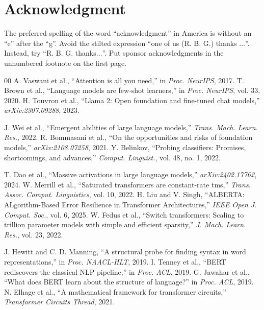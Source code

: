 \documentclass[conference]{IEEEtran}
\begin{document}
\section*{Acknowledgment}

The preferred spelling of the word ``acknowledgment'' in America is without 
an ``e'' after the ``g''. Avoid the stilted expression ``one of us (R. B. 
G.) thanks $\ldots$''. Instead, try ``R. B. G. thanks$\ldots$''. Put sponsor 
acknowledgments in the unnumbered footnote on the first page.


\begin{thebibliography}{00}
 A. Vaswani et al., ``Attention is all you need,'' in \emph{Proc. NeurIPS}, 2017.
 T. Brown et al., ``Language models are few-shot learners,'' in \emph{Proc. NeurIPS}, vol. 33, 2020.
 H. Touvron et al., ``Llama 2: Open foundation and fine-tuned chat models,'' \emph{arXiv:2307.09288}, 2023.

 J. Wei et al., ``Emergent abilities of large language models,'' \emph{Trans. Mach. Learn. Res.}, 2022.
 R. Bommasani et al., ``On the opportunities and risks of foundation models,'' \emph{arXiv:2108.07258}, 2021.
 Y. Belinkov, ``Probing classifiers: Promises, shortcomings, and advances,'' \emph{Comput. Linguist.}, vol. 48, no. 1, 2022.

 T. Dao et al., ``Massive activations in large language models,'' \emph{arXiv:2402.17762}, 2024.
 W. Merrill et al., ``Saturated transformers are constant-rate tms,'' \emph{Trans. Assoc. Comput. Linguistics}, vol. 10, 2022.
 H. Liu and V. Singh, ``ALBERTA: ALgorithm-Based Error Resilience in Transformer Architectures,'' \textit{IEEE Open J. Comput. Soc.}, vol. 6, 2025.
 W. Fedus et al., ``Switch transformers: Scaling to trillion parameter models with simple and efficient sparsity,'' \emph{J. Mach. Learn. Res.}, vol. 23, 2022.

 J. Hewitt and C. D. Manning, ``A structural probe for finding syntax in word representations,'' in \emph{Proc. NAACL-HLT}, 2019.
 I. Tenney et al., ``BERT rediscovers the classical NLP pipeline,'' in \emph{Proc. ACL}, 2019.
 G. Jawahar et al., ``What does BERT learn about the structure of language?'' in \emph{Proc. ACL}, 2019.
 N. Elhage et al., ``A mathematical framework for transformer circuits,'' \emph{Transformer Circuits Thread}, 2021.


\end{thebibliography}
\end{document}
